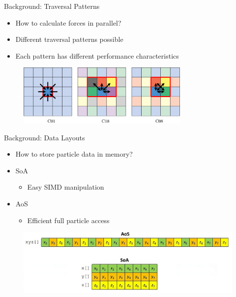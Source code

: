 \documentclass[
	10pt,
	t		%
]{beamer}
\begin{document}
\begin{frame}{Background: Traversal Patterns}
    \begin{itemize}
        \item How to calculate forces in parallel?
        \item Different traversal patterns possible
        \item Each pattern has different performance characteristics
    \end{itemize}

    \vspace{0.2cm}
    \begin{figure}
        \centering
        \includegraphics[width=0.75\textwidth]{figures/traversals.jpg}
        \caption{\small{\cite{NEWCOME2023115278}}}
    \end{figure}



\end{frame}


\begin{frame}{Background: Data Layouts}
    \begin{itemize}
        \item How to store particle data in memory?
        \item SoA
              \begin{itemize}
                  \item Easy SIMD manipulation
              \end{itemize}
        \item AoS
              \begin{itemize}
                  \item Efficient full particle access
              \end{itemize}

    \end{itemize}

    \vspace{0.2cm}
    \begin{figure}
        \centering
        \includegraphics[width=1\textwidth]{figures/data_layout.png}
        \caption{\small{\cite{ModernArchitecture}}}
    \end{figure}


\end{frame}
\end{document}
